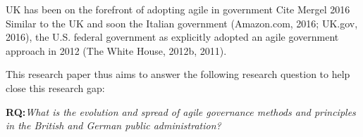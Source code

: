 
UK has been on the forefront of adopting agile in government 
Cite Mergel 2016
Similar to the UK and soon the Italian government (Amazon.com, 2016; UK.gov, 2016), the U.S. federal government as explicitly adopted an agile government approach in 2012 (The White House, 2012b, 2011). 





This research paper thus aims to answer the following research question to help close this research gap: 
\begin{addmargin}[2em]{2em}%
\textbf{RQ:}\textit{What is the evolution and spread of agile governance methods and principles in the British and German public administration?}\label{RQ1}
\end{addmargin}\par 